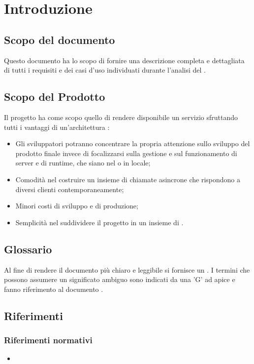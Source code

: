 \section{Introduzione}\label{Intro}
\subsection{Scopo del documento}
Questo documento ha lo scopo di fornire una descrizione completa e dettagliata di tutti i requisiti e dei casi d'uso individuati durante l'analisi del  \NomeProgetto{}.

\subsection{Scopo del Prodotto}
Il progetto {\NomeProgetto} ha come scopo quello di rendere disponibile un servizio  sfruttando tutti i vantaggi di un'architettura :
\begin{itemize}
  \item Gli sviluppatori potranno concentrare la propria attenzione sullo sviluppo del prodotto finale invece di focalizzarsi sulla gestione e sul funzionamento di server e di runtime, che siano nel  o in locale;
  \item Comodità nel costruire un insieme di chiamate asincrone che rispondono a diversi clienti contemporaneamente;
  \item Minori costi di sviluppo e di produzione;
  \item Semplicità nel suddividere il progetto in un insieme di .
\end{itemize}

\subsection{Glossario}
Al fine di rendere il documento più chiaro e leggibile si fornisce un \Glossario. I termini che possono assumere un significato ambiguo sono indicati da una 'G' ad apice e fanno riferimento al documento .

\subsection{Riferimenti}
\subsubsection{Riferimenti normativi}
\begin{itemize}
	\item {}
\end{itemize}
